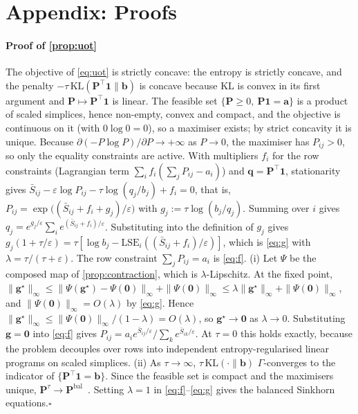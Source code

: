 \section*{Appendix: Proofs}\label{app:proofs}
\paragraph*{Proof of \cref{prop:uot}}
The objective of \eqref{eq:uot} is strictly concave: the entropy is strictly concave, and the penalty
$-\tau\,\mathrm{KL}(\mathbf{P}^\top\mathbf{1}\|\mathbf{b})$ is concave because KL is convex in its first
argument and $\mathbf{P}\mapsto\mathbf{P}^\top\mathbf{1}$ is linear. The feasible set
$\{\mathbf{P}\ge0,\ \mathbf{P}\mathbf{1}=\mathbf{a}\}$ is a product of scaled simplices, hence non-empty,
convex and compact, and the objective is continuous on it (with $0\log0=0$), so a maximiser exists; by
strict concavity it is unique. Because $\partial(-P\log P)/\partial P\to+\infty$ as $P\to0$, the
maximiser has $P_{ij}>0$, so only the equality constraints are active. With multipliers $f_i$ for the
row constraints (Lagrangian term $\sum_i f_i(\sum_jP_{ij}-a_i)$) and $\mathbf{q}=\mathbf{P}^\top\mathbf{1}$,
stationarity gives
$\bar S_{ij}-\varepsilon\log P_{ij}-\tau\log(q_j/b_j)+f_i=0$, that is,
$P_{ij}=\exp\big((\bar S_{ij}+f_i+g_j)/\varepsilon\big)$ with $g_j:=\tau\log(b_j/q_j)$.
Summing over $i$ gives $q_j=e^{g_j/\varepsilon}\sum_i e^{(\bar S_{ij}+f_i)/\varepsilon}$. Substituting
into the definition of $g_j$ gives
$g_j(1+\tau/\varepsilon)=\tau[\log b_j-\mathrm{LSE}_i((\bar S_{ij}+f_i)/\varepsilon)]$, which is
\eqref{eq:g} with $\lambda=\tau/(\tau+\varepsilon)$. The row constraint
$\sum_j P_{ij}=a_i$ is \eqref{eq:f}.
(i) Let $\Psi$ be the composed map of \cref{prop:contraction}, which is $\lambda$-Lipschitz. At the
fixed point, $\|\mathbf{g}^\star\|_\infty\le\|\Psi(\mathbf{g}^\star)-\Psi(\mathbf{0})\|_\infty+\|\Psi(\mathbf{0})\|_\infty
\le\lambda\|\mathbf{g}^\star\|_\infty+\|\Psi(\mathbf{0})\|_\infty$, and $\|\Psi(\mathbf{0})\|_\infty=O(\lambda)$ by
\eqref{eq:g}. Hence $\|\mathbf{g}^\star\|_\infty\le\|\Psi(\mathbf{0})\|_\infty/(1-\lambda)=O(\lambda)$, so
$\mathbf{g}^\star\to\mathbf{0}$ as $\lambda\to0$. Substituting $\mathbf{g}=\mathbf{0}$ into \eqref{eq:f} gives
$P_{ij}=a_i e^{\bar S_{ij}/\varepsilon}/\sum_k e^{\bar S_{ik}/\varepsilon}$. At $\tau=0$ this holds
exactly, because the problem decouples over rows into independent entropy-regularised linear
programs on scaled simplices.
(ii) As $\tau\to\infty$, $\tau\,\mathrm{KL}(\cdot\|\mathbf{b})$ $\Gamma$-converges to the indicator of
$\{\mathbf{P}^\top\mathbf{1}=\mathbf{b}\}$. Since the feasible set is compact and the maximisers
unique, $\mathbf{P}^\tau\to\mathbf{P}^{\mathrm{bal}}$~\cite{chizat2018scaling}. Setting $\lambda=1$
in \eqref{eq:f}--\eqref{eq:g} gives the balanced Sinkhorn equations.\hfill$\square$

